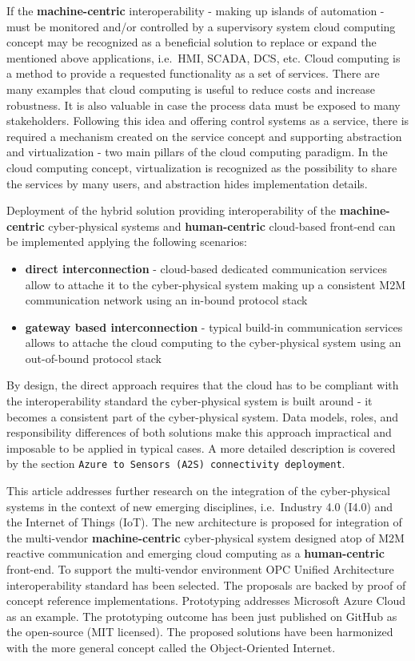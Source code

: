 \documentclass{jacsart}
\providecommand{\tightlist} { \setlength{\itemsep}{0pt}\setlength{\parskip}{0pt}}
\begin{document}
If the \textbf{machine-centric} interoperability - making up islands of
automation - must be monitored and/or controlled by a supervisory system
cloud computing concept may be recognized as a beneficial solution to
replace or expand the mentioned above applications, i.e.~HMI, SCADA,
DCS, etc. Cloud computing is a method to provide a requested
functionality as a set of services. There are many examples that cloud
computing is useful to reduce costs and increase robustness. It is also
valuable in case the process data must be exposed to many stakeholders.
Following this idea and offering control systems as a service, there is
required a mechanism created on the service concept and supporting
abstraction and virtualization - two main pillars of the cloud computing
paradigm. In the cloud computing concept, virtualization is recognized
as the possibility to share the services by many users, and abstraction
hides implementation details.

Deployment of the hybrid solution providing interoperability of the
\textbf{machine-centric} cyber-physical systems and
\textbf{human-centric} cloud-based front-end can be implemented applying
the following scenarios:

\begin{itemize}
\tightlist
\item
  \textbf{direct interconnection} - cloud-based dedicated communication
  services allow to attache it to the cyber-physical system making up a
  consistent M2M communication network using an in-bound protocol stack
\item
  \textbf{gateway based interconnection} - typical build-in
  communication services allows to attache the cloud computing to the
  cyber-physical system using an out-of-bound protocol stack
\end{itemize}

By design, the direct approach requires that the cloud has to be
compliant with the interoperability standard the cyber-physical system
is built around - it becomes a consistent part of the cyber-physical
system. Data models, roles, and responsibility differences of both
solutions make this approach impractical and imposable to be applied in
typical cases. A more detailed description is covered by the section
\texttt{Azure\ to\ Sensors\ (A2S)\ connectivity\ deployment}.

This article addresses further research on the integration of the
cyber-physical systems in the context of new emerging disciplines,
i.e.~Industry 4.0 (I4.0) and the Internet of Things (IoT). The new
architecture is proposed for integration of the multi-vendor
\textbf{machine-centric} cyber-physical system designed atop of M2M
reactive communication and emerging cloud computing as a
\textbf{human-centric} front-end. To support the multi-vendor
environment OPC Unified Architecture interoperability standard has been
selected. The proposals are backed by proof of concept reference
implementations. Prototyping addresses Microsoft Azure Cloud as an
example. The prototyping outcome has been just published on GitHub as
the open-source (MIT licensed). The proposed solutions have been
harmonized with the more general concept called the Object-Oriented
Internet.
\end{document}
